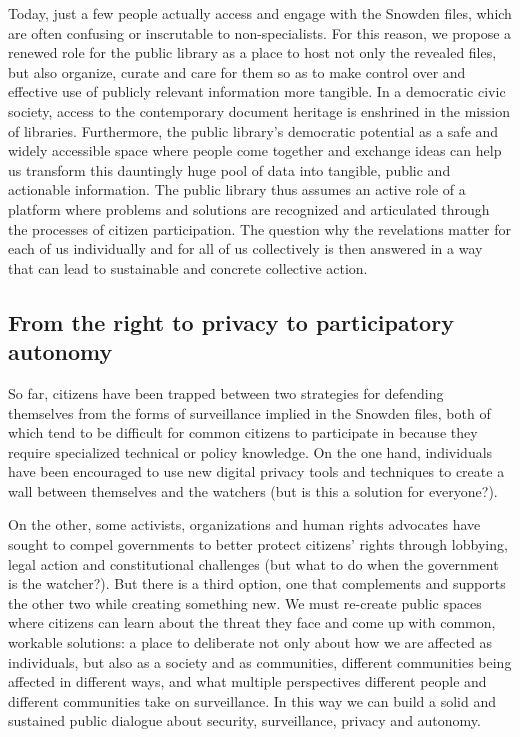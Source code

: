 \documentclass[a4paper,
fontsize=11pt,
oneside,
numbers=noperiodatend,
parskip=half-,
bibliography=totoc,
final
]{scrartcl}
\begin{document}
Today, just a few people actually access and engage with the Snowden
files, which are often confusing or inscrutable to non-specialists. For
this reason, we propose a renewed role for the public library as a place
to host not only the revealed files, but also organize, curate and care
for them so as to make control over and effective use of publicly
relevant information more tangible. In a democratic civic society,
access to the contemporary document heritage is enshrined in the mission
of libraries. Furthermore, the public library's democratic potential as
a safe and widely accessible space where people come together and
exchange ideas can help us transform this dauntingly huge pool of data
into tangible, public and actionable information. The public library
thus assumes an active role of a platform where problems and solutions
are recognized and articulated through the processes of citizen
participation. The question why the revelations matter for each of us
individually and for all of us collectively is then answered in a way
that can lead to sustainable and concrete collective action.

\subsection*{From the right to privacy to participatory
autonomy}\label{from-the-right-to-privacy-to-participatory-autonomy}

So far, citizens have been trapped between two strategies for defending
themselves from the forms of surveillance implied in the Snowden files,
both of which tend to be difficult for common citizens to participate in
because they require specialized technical or policy knowledge. On the
one hand, individuals have been encouraged to use new digital privacy
tools and techniques to create a wall between themselves and the
watchers (but is this a solution for everyone?).

On the other, some activists, organizations and human rights advocates
have sought to compel governments to better protect citizens' rights
through lobbying, legal action and constitutional challenges (but what
to do when the government is the watcher?). But there is a third option,
one that complements and supports the other two while creating something
new. We must re-create public spaces where citizens can learn about the
threat they face and come up with common, workable solutions: a place to
deliberate not only about how we are affected as individuals, but also
as a society and as communities, different communities being affected in
different ways, and what multiple perspectives different people and
different communities take on surveillance. In this way we can build a
solid and sustained public dialogue about security, surveillance,
privacy and autonomy.
\end{document}
